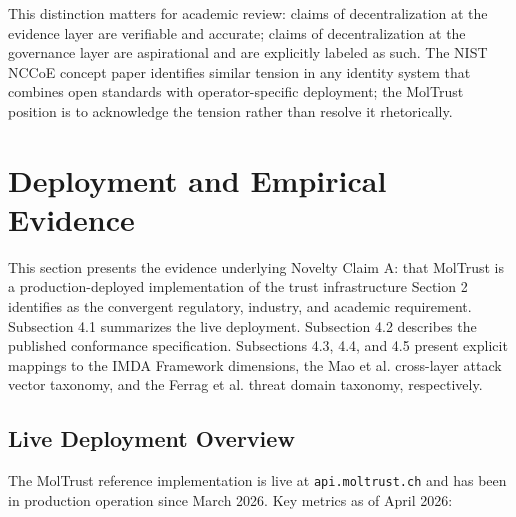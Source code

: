This distinction matters for academic review: claims of decentralization at the evidence layer are verifiable and accurate; claims of decentralization at the governance layer are aspirational and are explicitly labeled as such. The NIST NCCoE concept paper \cite{ref10_nccoe} identifies similar tension in any identity system that combines open standards with operator-specific deployment; the MolTrust position is to acknowledge the tension rather than resolve it rhetorically.



\section{Deployment and Empirical Evidence}

This section presents the evidence underlying Novelty Claim A: that MolTrust is a production-deployed implementation of the trust infrastructure Section 2 identifies as the convergent regulatory, industry, and academic requirement. Subsection 4.1 summarizes the live deployment. Subsection 4.2 describes the published conformance specification. Subsections 4.3, 4.4, and 4.5 present explicit mappings to the IMDA Framework dimensions, the Mao et al. cross-layer attack vector taxonomy, and the Ferrag et al. threat domain taxonomy, respectively.


\subsection{Live Deployment Overview}

The MolTrust reference implementation is live at \texttt{api.moltrust.ch} and has been in production operation since March 2026. Key metrics as of April 2026:


